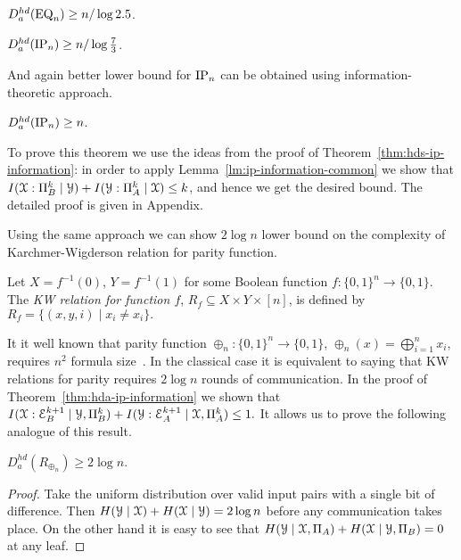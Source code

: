 \begin{theorem}\label{thm:lb-a-eq}
$D^{hd}_a(\mathrm{EQ}_n) \ge n/\log 2.5$.
\end{theorem}
\begin{theorem}\label{thm:lb-a-ip}
$D^{hd}_a(\mathrm{IP}_n)\ge n/\log\frac{7}{3}$.
\end{theorem}
And again better lower bound for $\mathrm{IP}_n$ can be obtained using  information-theoretic approach.
\begin{theorem}\label{thm:hda-ip-information}
$D^{hd}_a(\mathrm{IP}_n) \ge n$.
\end{theorem}
To prove this theorem we use the ideas from the proof of Theorem~\ref{thm:hds-ip-information}: 
in order to apply Lemma~\ref{lm:ip-information-common} we
show that $I(\mathcal{X}:\Pi_B^k\mid\mathcal{Y}) + I(\mathcal{Y}:\Pi_A^k\mid\mathcal{X})\leq k$, and hence we get the desired bound.
The detailed proof is given in Appendix.

Using the same approach we can show $2\log n$ lower bound 
on the complexity of Karchmer-Wigderson relation for parity function.
\begin{definition}
Let $X=f^{-1}(0)$, $Y = f^{-1}(1)$ for some Boolean function $f:\{0,1\}^n\to\{0,1\}$.
The \emph{KW relation for function $f$}, $R_f\subseteq X \times Y \times [n]$, is defined by
$R_f = \{(x,y,i)\mid x_i \neq x_i\}.$
\end{definition}
It it well known that parity function $\oplus_n: \{0,1\}^n\to \{0,1\}$, $\oplus_n(x) = \bigoplus_{i=1}^n x_i$, requires $n^2$ formula size~\cite{Kh72}. 
In the classical case it is equivalent to saying that KW relations for parity requires $2\log n$
rounds of communication. In the proof of Theorem~\ref{thm:hda-ip-information} we shown that
$I(\mathcal{X}:\mathcal{E}^{k+1}_B\mid\mathcal{Y},\Pi^k_B)+I(\mathcal{Y}:\mathcal{E}^{k+1}_A\mid\mathcal{X},\Pi^k_A)\leq 1.$
It allows us to prove the following analogue of this result.

\begin{corollary}
$D^{hd}_a(R_{\oplus_n}) \ge 2\log n$.
\end{corollary}
\begin{proof}
Take the uniform distribution over valid input pairs with a single bit of difference.
Then $H(\mathcal{Y}\mid\mathcal{X})+H(\mathcal{X}\mid\mathcal{Y})=2\log n$ before any communication takes place. On the other hand it is easy to see that $H(\mathcal{Y}\mid\mathcal{X},\Pi_A)+H(\mathcal{X}\mid\mathcal{Y},\Pi_B)=0$ at any leaf.
\end{proof}

